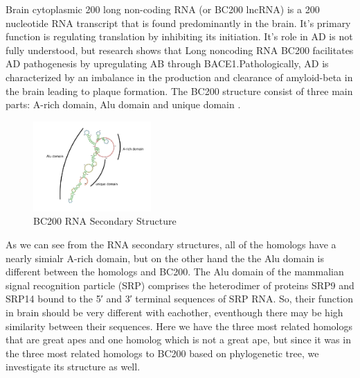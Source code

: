 \documentclass[conference]{IEEEtran}
\begin{document}
Brain cytoplasmic 200 long non-coding RNA (or BC200 lncRNA) is a 200 nucleotide RNA transcript that is found predominantly in the brain. It's primary function is regulating translation by inhibiting its initiation.
It's role in AD is not fully understood, but research shows that Long noncoding RNA BC200 facilitates AD pathogenesis by upregulating AB through BACE1.Pathologically, AD is characterized by an imbalance in the production and clearance of amyloid-beta in the brain leading to plaque formation.\cite{li2018identification}
The BC200 structure consist of three main parts: A-rich domain, Alu domain and unique domain \cite{jung2014rna}.
\begin{figure}
  \centering
  \includegraphics[width=0.4\textwidth]{figs/rna-6.png}
  \caption{BC200 RNA Secondary Structure}
\end{figure}
As we can see from the RNA secondary structures, all of the homologs have a nearly simialr A-rich domain, but on the other hand the the Alu domain is different between the homologs and BC200. The Alu domain of the mammalian signal recognition particle (SRP) comprises the heterodimer of proteins SRP9 and SRP14 bound to the 5′ and 3′ terminal sequences of SRP RNA\cite{weichenrieder2000structure}. So, their function in brain should be very different with eachother, eventhough there may be high similarity between their sequences. Here we have the three most related homologs that are great apes and one homolog which is not a great ape, but since it was in the three most related homologs to BC200 based on phylogenetic tree, we investigate its structure as well.
\end{document}
